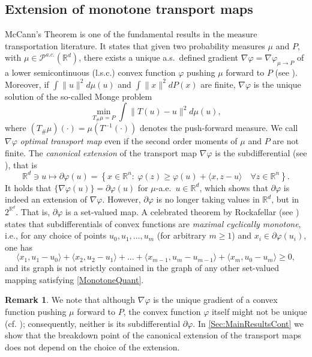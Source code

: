 \documentclass[11pt]{article}
\newcommand{\R}{\mathbb{R}}
\theoremstyle{plain}
\theoremstyle{definition}
\newtheorem{remark}[sectioncount]{Remark}
\begin{document}
\subsection{Extension of monotone transport maps}\label{Sec:extension}
%
McCann's Theorem is one of the fundamental results in the measure transportation literature. It states that given two probability measures $\mu $ and $P$, with $ \mu \in  \mathcal{P}^{a.c.}(\R^d) $, there exists a unique a.s.\ defined gradient $\nabla \varphi=\nabla \varphi_{\mu\to P}$ of a lower semicontinuous (l.s.c.) convex function  $\varphi$  pushing $\mu$ forward to $P$ (see \cite{McCann.95}).  Moreover, if $\int \|u\|^2d\mu(u)$ and $\int \|x\|^2dP(x)$ are finite, $\nabla \varphi$ is the unique solution of the so-called Monge problem 
$$ \min_{T_\# \mu=P} \int \|T(u)-u\|^2 d\mu(u),  $$
where $(T_\# \mu)(\cdot)=\mu(T^{-1}(\cdot))$ denotes the push-forward measure. We call $\nabla \varphi$ {\it optimal transport map} even if the second order moments of $\mu$ and $P$ are not finite. 
The {\it canonical extension} of the transport map $\nabla \varphi$ is the subdifferential (see \cite{HallinDelBarrioCuestaAlbertosMatran.21,delBarriodoGonzalezSanzHallin.24,segers2022graphicaluniformconsistencyestimated,Figalli.2018,delBarrioGonzalezHallin.2020}), that is
\[
\R^d\ni u\mapsto \partial \varphi(u) = \left\{ x \in \mathbb{R}^n :
 \ \varphi(z) \geq \varphi(u) + \langle x, z - u \rangle \quad \forall z \in \mathbb{R}^n \right\}.
\]
It holds that $\{\nabla \varphi(u)\}= \partial \varphi(u)$ for $\mu$-a.e.\ $u\in \R^d$, which shows that $ \partial \varphi$ is indeed an extension of $ \nabla \varphi$.  However,  $\partial \varphi$ is no longer taking values in $\R^d$, but in $2^{\R^d}$. That is, $\partial \varphi$ is a set-valued map. 
A celebrated theorem by Rockafellar (see \cite{Rockafellar.MaximalMon}) states that subdifferentials of convex functions are {\it maximal {  cyclically} monotone}, i.e., {  for any choice of points $u_0,u_1,\dots,u_m$ (for arbitrary $m\geq 1$) and $x_i\in \partial \varphi(u_i)$, one has
%
\begin{equation}
    \label{MonotoneQuant}
    \langle x_1 , u_1 - u_0 \rangle +\langle x_2 , u_2- u_1 \rangle +\dots+\langle x_{m-1}, u_m - u_{m-1} \rangle+ \langle x_m, u_0 - u_m \rangle \geq 0 ,
\end{equation}
}
and its graph is not strictly contained in the graph of any  other set-valued mapping satisfying \eqref{MonotoneQuant}. 

\begin{remark}\label{remark:UniqueExtension}
   {  We note that although $\nabla \varphi$ is the unique gradient of a convex function pushing $\mu$ forward to $P$, the convex function $\varphi$ itself might not be unique (cf. \cite{McCann.95}); consequently, neither is its subdifferential $\partial \varphi$.} In \autoref{Sec:MainResultsCont} we show that the breakdown point of the canonical extension of the transport maps does not depend on the choice of the extension.    
\end{remark}
\end{document}
